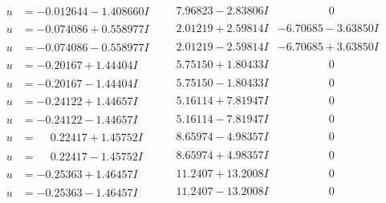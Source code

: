 \documentclass[1p]{elsarticle_modified}
\theoremstyle{definition}
\begin{document}
$$\begin{array}{c|c|c}
 \hline 
\begin{aligned}
u &= -0.012644 - 1.408660 I\end{aligned}
 & \phantom{-}7.96823 - 2.83806 I & \phantom{-0.000000 } 0 \\ \hline\begin{aligned}
u &= -0.074086 + 0.558977 I\end{aligned}
 & \phantom{-}2.01219 + 2.59814 I & -6.70685 - 3.63850 I \\ \hline\begin{aligned}
u &= -0.074086 - 0.558977 I\end{aligned}
 & \phantom{-}2.01219 - 2.59814 I & -6.70685 + 3.63850 I \\ \hline\begin{aligned}
u &= -0.20167 + 1.44404 I\end{aligned}
 & \phantom{-}5.75150 + 1.80433 I & \phantom{-0.000000 } 0 \\ \hline\begin{aligned}
u &= -0.20167 - 1.44404 I\end{aligned}
 & \phantom{-}5.75150 - 1.80433 I & \phantom{-0.000000 } 0 \\ \hline\begin{aligned}
u &= -0.24122 + 1.44657 I\end{aligned}
 & \phantom{-}5.16114 + 7.81947 I & \phantom{-0.000000 } 0 \\ \hline\begin{aligned}
u &= -0.24122 - 1.44657 I\end{aligned}
 & \phantom{-}5.16114 - 7.81947 I & \phantom{-0.000000 } 0 \\ \hline\begin{aligned}
u &= \phantom{-}0.22417 + 1.45752 I\end{aligned}
 & \phantom{-}8.65974 - 4.98357 I & \phantom{-0.000000 } 0 \\ \hline\begin{aligned}
u &= \phantom{-}0.22417 - 1.45752 I\end{aligned}
 & \phantom{-}8.65974 + 4.98357 I & \phantom{-0.000000 } 0 \\ \hline\begin{aligned}
u &= -0.25363 + 1.46457 I\end{aligned}
 & \phantom{-}11.2407 + 13.2008 I & \phantom{-0.000000 } 0 \\ \hline\begin{aligned}
u &= -0.25363 - 1.46457 I\end{aligned}
 & \phantom{-}11.2407 - 13.2008 I & \phantom{-0.000000 } 0 \\ \hline\begin{aligned}

\end{aligned}
\end{array}$$
\end{document}
